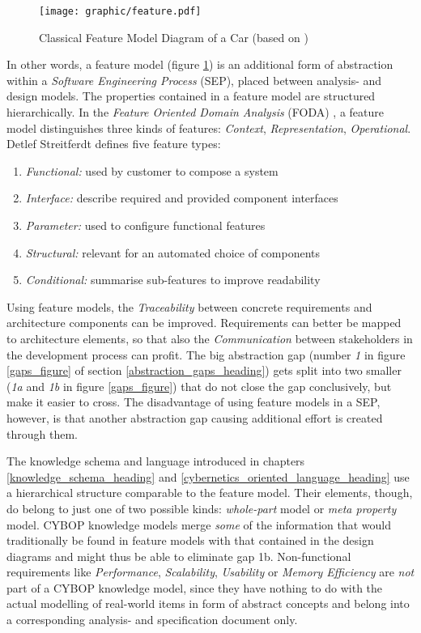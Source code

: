 \begin{figure}[ht]
    \begin{center}
        \texttt{[image: graphic/feature.pdf]}
        \caption{Classical Feature Model Diagram of a Car (based on \cite{pashov})}
        \label{feature_figure}
    \end{center}
\end{figure}

In other words, a feature model (figure \ref{feature_figure}) is an additional
form of abstraction within a \emph{Software Engineering Process} (SEP), placed
between analysis- and design models. The properties contained in a feature model
are structured hierarchically. In the \emph{Feature Oriented Domain Analysis}
(FODA) \cite{foda}, a feature model distinguishes three kinds of features:
\emph{Context}, \emph{Representation}, \emph{Operational}. Detlef Streitferdt
\cite{streitferdt200412} defines five feature types:

\begin{enumerate}
    \item \emph{Functional:} used by customer to compose a system
    \item \emph{Interface:} describe required and provided component interfaces
    \item \emph{Parameter:} used to configure functional features
    \item \emph{Structural:} relevant for an automated choice of components
    \item \emph{Conditional:} summarise sub-features to improve readability
\end{enumerate}

Using feature models, the \emph{Traceability} between concrete requirements and
architecture components can be improved. Requirements can better be mapped to
architecture elements, so that also the \emph{Communication} between
stakeholders in the development process can profit. The big abstraction gap
(number \emph{1} in figure \ref{gaps_figure} of section
\ref{abstraction_gaps_heading}) gets split into two smaller (\emph{1a} and
\emph{1b} in figure \ref{gaps_figure}) that do not close the gap conclusively,
but make it easier to cross. The disadvantage of using feature models in a SEP,
however, is that another abstraction gap causing additional effort is created
through them.

The knowledge schema and language introduced in chapters
\ref{knowledge_schema_heading} and \ref{cybernetics_oriented_language_heading}
use a hierarchical structure comparable to the feature model. Their elements,
though, do belong to just one of two possible kinds: \emph{whole-part} model or
\emph{meta property} model. CYBOP knowledge models merge \emph{some} of the
information that would traditionally be found in feature models with that
contained in the design diagrams and might thus be able to eliminate gap 1b.
Non-functional requirements like \emph{Performance}, \emph{Scalability},
\emph{Usability} or \emph{Memory Efficiency} are \emph{not} part of a CYBOP
knowledge model, since they have nothing to do with the actual modelling of
real-world items in form of abstract concepts and belong into a corresponding
analysis- and specification document only.
